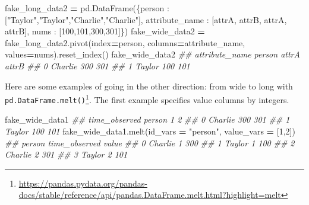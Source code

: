 \documentclass[
  12pt,
  krantz2]{krantz}
\makeatletter
\newenvironment{Shaded}{\begin{snugshade}}{\end{snugshade}}
\newcommand{\CommentTok}[1]{\textcolor[rgb]{0.37,0.37,0.37}{\textit{#1}}}
\newcommand{\DecValTok}[1]{\textcolor[rgb]{0.06,0.06,0.06}{#1}}
\newcommand{\NormalTok}[1]{#1}
\newcommand{\OperatorTok}[1]{\textcolor[rgb]{0.43,0.43,0.43}{\textbf{#1}}}
\newcommand{\StringTok}[1]{\textcolor[rgb]{0.5,0.5,0.5}{#1}}
\renewcommand{\href}[2]{#2\footnote{\url{#1}}}
\newenvironment{kframe}{%
\medskip{}
\setlength{\fboxsep}{.8em}
 \def\at@end@of@kframe{}%
 \ifinner\ifhmode%
  \def\at@end@of@kframe{\end{minipage}}%
  \begin{minipage}{\columnwidth}%
 \fi\fi%
 \def\FrameCommand##1{\hskip\@totalleftmargin \hskip-\fboxsep
 \colorbox{shadecolor}{##1}\hskip-\fboxsep
     \hskip-\linewidth \hskip-\@totalleftmargin \hskip\columnwidth}%
 \MakeFramed {\advance\hsize-\width
   \@totalleftmargin\z@ \linewidth\hsize
   \@setminipage}}%
 {\par\unskip\endMakeFramed%
 \at@end@of@kframe}
\renewenvironment{Shaded}{\begin{kframe}}{\end{kframe}}
\makeatother
\begin{document}
\begin{Shaded}
\begin{Highlighting}[]
\NormalTok{fake\_long\_data2 }\OperatorTok{=}\NormalTok{ pd.DataFrame(\{}\StringTok{\textquotesingle{}person\textquotesingle{}}\NormalTok{ : [}\StringTok{"Taylor"}\NormalTok{,}\StringTok{"Taylor"}\NormalTok{,}\StringTok{"Charlie"}\NormalTok{,}\StringTok{"Charlie"}\NormalTok{], }
                               \StringTok{\textquotesingle{}attribute\_name\textquotesingle{}}\NormalTok{ : [}\StringTok{\textquotesingle{}attrA\textquotesingle{}}\NormalTok{, }\StringTok{\textquotesingle{}attrB\textquotesingle{}}\NormalTok{, }\StringTok{\textquotesingle{}attrA\textquotesingle{}}\NormalTok{, }\StringTok{\textquotesingle{}attrB\textquotesingle{}}\NormalTok{],}
                               \StringTok{\textquotesingle{}nums\textquotesingle{}}\NormalTok{ : [}\DecValTok{100}\NormalTok{,}\DecValTok{101}\NormalTok{,}\DecValTok{300}\NormalTok{,}\DecValTok{301}\NormalTok{]\})}
\NormalTok{fake\_wide\_data2 }\OperatorTok{=}\NormalTok{ fake\_long\_data2.pivot(index}\OperatorTok{=}\StringTok{\textquotesingle{}person\textquotesingle{}}\NormalTok{, }
\NormalTok{                                        columns}\OperatorTok{=}\StringTok{\textquotesingle{}attribute\_name\textquotesingle{}}\NormalTok{, }
\NormalTok{                                        values}\OperatorTok{=}\StringTok{\textquotesingle{}nums\textquotesingle{}}\NormalTok{).reset\_index()}
\NormalTok{fake\_wide\_data2}
\CommentTok{\#\# attribute\_name   person  attrA  attrB}
\CommentTok{\#\# 0               Charlie    300    301}
\CommentTok{\#\# 1                Taylor    100    101}
\end{Highlighting}
\end{Shaded}

Here are some examples of going in the other direction: from wide to long with \href{https://pandas.pydata.org/pandas-docs/stable/reference/api/pandas.DataFrame.melt.html?highlight=melt}{\texttt{pd.DataFrame.melt()}}. The first example specifies value columns by integers.

\begin{Shaded}
\begin{Highlighting}[]
\NormalTok{fake\_wide\_data1}
\CommentTok{\#\# time\_observed   person    1    2}
\CommentTok{\#\# 0              Charlie  300  301}
\CommentTok{\#\# 1               Taylor  100  101}
\NormalTok{fake\_wide\_data1.melt(id\_vars }\OperatorTok{=} \StringTok{"person"}\NormalTok{, value\_vars }\OperatorTok{=}\NormalTok{ [}\DecValTok{1}\NormalTok{,}\DecValTok{2}\NormalTok{])}
\CommentTok{\#\#     person time\_observed  value}
\CommentTok{\#\# 0  Charlie             1    300}
\CommentTok{\#\# 1   Taylor             1    100}
\CommentTok{\#\# 2  Charlie             2    301}
\CommentTok{\#\# 3   Taylor             2    101}
\end{Highlighting}
\end{Shaded}
\end{document}
